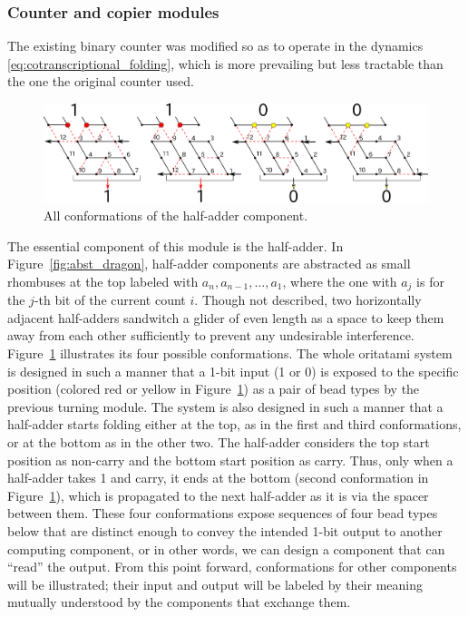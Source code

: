 			\subsubsection{Counter and copier modules}
			\label{subsubsec:module_counter}

The existing binary counter \cite{GeMeScSe2016} was modified so as to operate in the dynamics \eqref{eq:cotranscriptional_folding}, which is more prevailing \cite{GeMeScSe2015,HanKim2017,HaKiOtSe2016,OtaSeki2017} but less tractable than the one the original counter used. 

\begin{figure}[h]
\includegraphics[width=\linewidth]{pic/counter_zig.png}
 \caption{All conformations of the half-adder component.}
\label{fig:half-adder}
\end{figure}

The essential component of this module is the half-adder. 
In Figure~\ref{fig:abst_dragon}, half-adder components are abstracted as small rhombuses at the top labeled with $a_n, a_{n-1}, \ldots, a_1$, where the one with $a_j$ is for the $j$-th bit of the current count $i$. 
Though not described, two horizontally adjacent half-adders sandwitch a glider of even length as a space to keep them away from each other sufficiently to prevent any undesirable interference. 
Figure~\ref{fig:half-adder} illustrates its four possible conformations. 
The whole oritatami system is designed in such a manner that a 1-bit input (1 or 0) is exposed to the specific position (colored red or yellow in Figure~\ref{fig:half-adder}) as a pair of bead types by the previous turning module. 
The system is also designed in such a manner that a half-adder starts folding either at the top, as in the first and third conformations, or at the bottom as in the other two. 
The half-adder considers the top start position as non-carry and the bottom start position as carry. 
Thus, only when a half-adder takes 1 and carry, it ends at the bottom (second conformation in Figure~\ref{fig:half-adder}), which is propagated to the next half-adder as it is via the spacer between them. 
These four conformations expose sequences of four bead types below that are distinct enough to convey the intended 1-bit output to another computing component, or in other words, we can design a component that can ``read'' the output. 
From this point forward, conformations for other components will be illustrated; their input and output will be labeled by their meaning mutually understood by the components that exchange them. 

